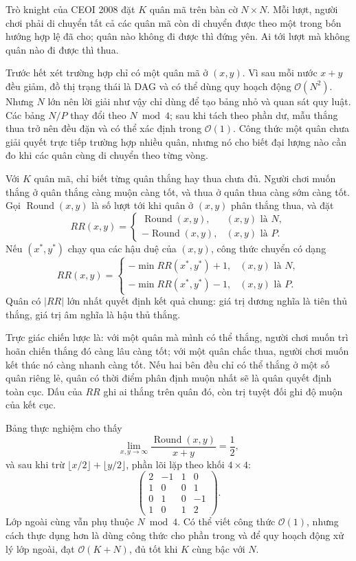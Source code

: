 \documentclass[11pt]{article}
\newcommand{\Oh}{\mathcal{O}}
\begin{document}
Trò knight của CEOI 2008 đặt \(K\) quân mã trên bàn cờ \(N\times N\). Mỗi lượt,
người chơi phải di chuyển tất cả các quân mã còn di chuyển được theo một trong
bốn hướng hợp lệ đã cho; quân nào không đi được thì đứng yên. Ai tới lượt mà
không quân nào đi được thì thua.

Trước hết xét trường hợp chỉ có một quân mã ở \((x,y)\). Vì sau mỗi nước
\(x+y\) đều giảm, đồ thị trạng thái là DAG và có thể dùng quy hoạch động
\(\Oh(N^2)\). Nhưng \(N\) lớn nên lời giải như vậy chỉ dùng để tạo bảng nhỏ và
quan sát quy luật. Các bảng \(N/P\) thay đổi theo \(N\bmod 4\); sau khi tách
theo phần dư, mẫu thắng thua trở nên đều đặn và có thể xác định trong
\(\Oh(1)\). Công thức một quân chưa giải quyết trực tiếp trường hợp nhiều quân,
nhưng nó cho biết đại lượng nào cần đo khi các quân cùng di chuyển theo từng
vòng.

Với \(K\) quân mã, chỉ biết từng quân thắng hay thua chưa đủ. Người chơi muốn
thắng ở quân thắng càng muộn càng tốt, và thua ở quân thua càng sớm càng tốt.
Gọi \(\operatorname{Round}(x,y)\) là số lượt tới khi quân ở \((x,y)\) phân
thắng thua, và đặt
\[
RR(x,y)=
\begin{cases}
  \operatorname{Round}(x,y), & (x,y)\text{ là }N,\\
 -\operatorname{Round}(x,y), & (x,y)\text{ là }P.
\end{cases}
\]
Nếu \((x^*,y^*)\) chạy qua các hậu duệ của \((x,y)\), công thức chuyển có dạng
\[
RR(x,y)=
\begin{cases}
  -\min RR(x^*,y^*)+1, & (x,y)\text{ là }N,\\
  -\min RR(x^*,y^*)-1, & (x,y)\text{ là }P.
\end{cases}
\]
Quân có \(|RR|\) lớn nhất quyết định kết quả chung: giá trị dương nghĩa là
tiên thủ thắng, giá trị âm nghĩa là hậu thủ thắng.

Trực giác chiến lược là: với một quân mà mình có thể thắng, người chơi muốn
trì hoãn chiến thắng đó càng lâu càng tốt; với một quân chắc thua, người chơi
muốn kết thúc nó càng nhanh càng tốt. Nếu hai bên đều chỉ có thể thắng ở một
số quân riêng lẻ, quân có thời điểm phân định muộn nhất sẽ là quân quyết định
toàn cục. Dấu của \(RR\) ghi ai thắng trên quân đó, còn trị tuyệt đối ghi độ
muộn của kết cục.

Bảng thực nghiệm cho thấy
\[
  \lim_{x,y\to\infty}\frac{\operatorname{Round}(x,y)}{x+y}=\frac12,
\]
và sau khi trừ \(\lfloor x/2\rfloor+\lfloor y/2\rfloor\), phần lõi lặp theo
khối \(4\times 4\):
\[
\begin{pmatrix}
 2&-1& 1& 0\\
 1& 0& 0& 1\\
 0& 1& 0&-1\\
 1& 0& 1& 2
\end{pmatrix}.
\]
Lớp ngoài cùng vẫn phụ thuộc \(N\bmod 4\). Có thể viết công thức \(\Oh(1)\),
nhưng cách thực dụng hơn là dùng công thức cho phần trong và để quy hoạch động
xử lý lớp ngoài, đạt \(\Oh(K+N)\), đủ tốt khi \(K\) cùng bậc với \(N\).
\end{document}
